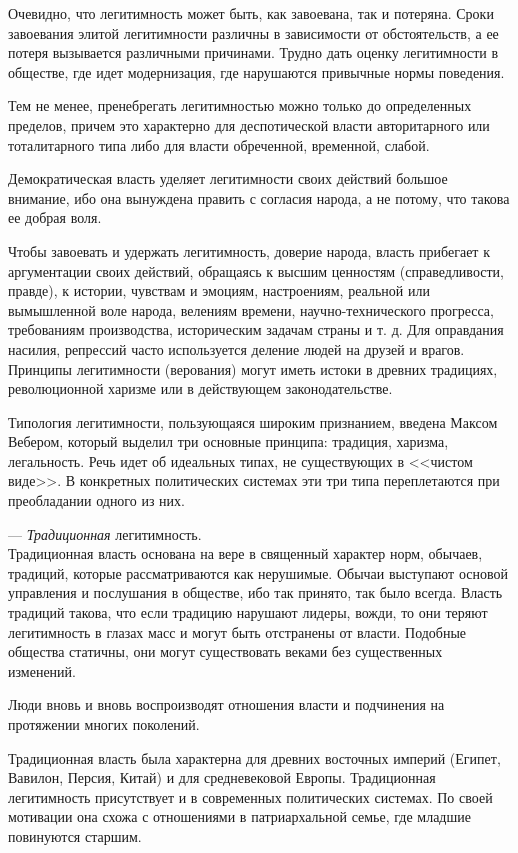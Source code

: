 Очевидно, что легитимность может быть, как завоевана, так и потеряна. Сроки
завоевания элитой легитимности различны в зависимости от обстоятельств, а ее
потеря вызывается различными причинами. Трудно дать оценку легитимности в
обществе, где идет модернизация, где нарушаются привычные нормы поведения.

Тем не менее, пренебрегать легитимностью можно только до определенных пределов,
причем это характерно для деспотической власти авторитарного или тоталитарного
типа либо для власти обреченной, временной, слабой.

Демократическая власть уделяет легитимности своих действий большое внимание,
ибо она вынуждена править с согласия народа, а не потому, что такова ее добрая
воля.

Чтобы завоевать и удержать легитимность, доверие народа, власть прибегает к
аргументации своих действий, обращаясь к высшим ценностям (справедливости,
правде), к истории, чувствам и эмоциям, настроениям, реальной или вымышленной
воле народа, велениям времени, научно-технического прогресса, требованиям
производства, историческим задачам страны и т. д. Для оправдания насилия,
репрессий часто используется деление людей на друзей и врагов. Принципы
легитимности (верования) могут иметь истоки в древних традициях, революционной
харизме или в действующем законодательстве.

Типология легитимности, пользующаяся широким признанием, введена Максом
Вебером, который выделил три основные принципа: традиция, харизма, легальность.
Речь идет об идеальных типах, не существующих в <<чистом виде>>. В конкретных
политических системах эти три типа переплетаются при преобладании одного из
них.

\vspace*{1em}
--- \emph{Традиционная} легитимность.\\
Традиционная власть основана на вере в священный характер норм, обычаев,
традиций, которые рассматриваются как нерушимые. Обычаи выступают основой
управления и послушания в обществе, ибо так принято, так было всегда. Власть
традиций такова, что если традицию нарушают лидеры, вожди, то они теряют
легитимность в глазах масс и могут быть отстранены от власти. Подобные общества
статичны, они могут существовать веками без существенных изменений.

Люди вновь и вновь воспроизводят отношения власти и подчинения на протяжении
многих поколений.

Традиционная власть была характерна для древних восточных империй (Египет,
Вавилон, Персия, Китай) и для средневековой Европы. Традиционная легитимность
присутствует и в современных политических системах. По своей мотивации она
схожа с отношениями в патриархальной семье, где младшие повинуются старшим.

